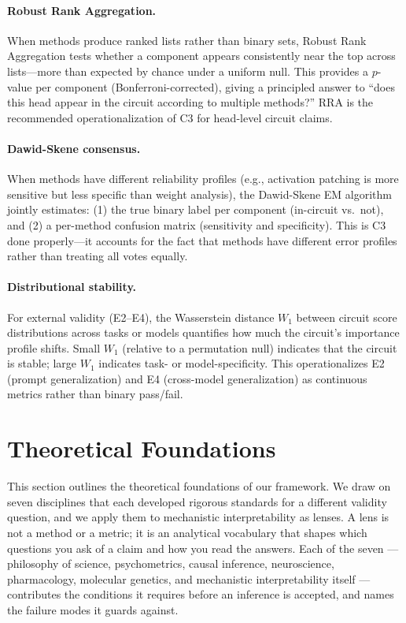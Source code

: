\documentclass{article}
\begin{document}
\paragraph{Robust Rank Aggregation.} When methods produce ranked lists rather than binary sets, Robust Rank Aggregation \citep{kolde2012robust} tests whether a component appears consistently near the top across lists---more than expected by chance under a uniform null. This provides a $p$-value per component (Bonferroni-corrected), giving a principled answer to ``does this head appear in the circuit according to multiple methods?'' RRA is the recommended operationalization of C3 for head-level circuit claims.

\paragraph{Dawid-Skene consensus.} When methods have different reliability profiles (e.g., activation patching is more sensitive but less specific than weight analysis), the Dawid-Skene EM algorithm \citep{dawid1979maximum} jointly estimates: (1) the true binary label per component (in-circuit vs.\ not), and (2) a per-method confusion matrix (sensitivity and specificity). This is C3 done properly---it accounts for the fact that methods have different error profiles rather than treating all votes equally.

\paragraph{Distributional stability.} For external validity (E2--E4), the Wasserstein distance $W_1$ between circuit score distributions across tasks or models quantifies how much the circuit's importance profile shifts. Small $W_1$ (relative to a permutation null) indicates that the circuit is stable; large $W_1$ indicates task- or model-specificity. This operationalizes E2 (prompt generalization) and E4 (cross-model generalization) as continuous metrics rather than binary pass/fail.

\section{Theoretical Foundations}
\label{sec:foundations}

This section outlines the theoretical foundations of our framework. We draw on seven disciplines that each developed rigorous standards for a different validity question, and we apply them to mechanistic interpretability as lenses. A lens is not a method or a metric; it is an analytical vocabulary that shapes which questions you ask of a claim and how you read the answers. Each of the seven --- philosophy of science, psychometrics, causal inference, neuroscience, pharmacology, molecular genetics, and mechanistic interpretability itself --- contributes the conditions it requires before an inference is accepted, and names the failure modes it guards against.
\end{document}
